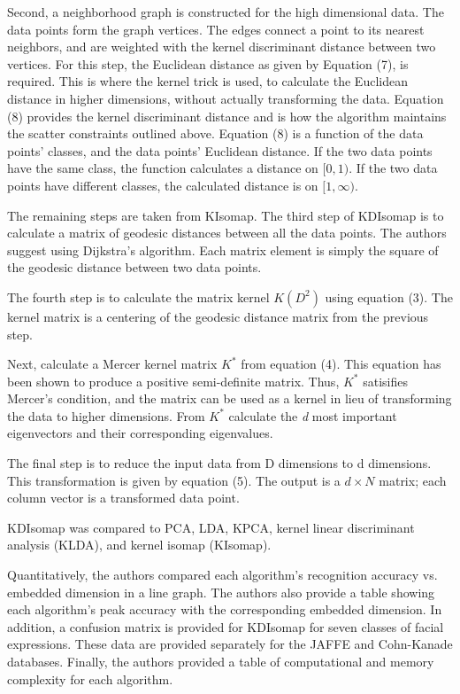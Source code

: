 \documentclass[11pt]{article}
\begin{document}
\begin{description}[leftmargin=0in]
        Second, a neighborhood graph is constructed for the high dimensional
        data. The data points form the graph vertices. The edges connect a point
        to its nearest neighbors, and are weighted with the kernel discriminant
        distance between two vertices. For this step, the Euclidean distance as
        given by Equation (7), is required. This is where the kernel trick is
        used, to calculate the Euclidean distance in higher dimensions, without
        actually transforming the data. Equation (8) provides the kernel
        discriminant distance and is how the algorithm maintains the scatter
        constraints outlined above. Equation (8) is a function of the data
        points' classes, and the data points' Euclidean distance. If the two
        data points have the same class, the function calculates a distance on
        \([0, 1)\). If the two data points have different classes, the
        calculated distance is on \([1, \infty)\).

        The remaining steps are taken from KIsomap. The third step of KDIsomap
        is to calculate a matrix of geodesic distances between all the data
        points. The authors suggest using Dijkstra's algorithm. Each matrix
        element is simply the square of the geodesic distance between two data
        points.

        The fourth step is to calculate the matrix kernel \(K(D^2)\) using
        equation (3). The kernel matrix is a centering of the geodesic distance
        matrix from the previous step.

        Next, calculate a Mercer kernel matrix \(K^*\) from equation (4). This
        equation has been shown to produce a positive semi-definite matrix.
        Thus, \(K^*\) satisifies Mercer's condition, and the matrix can be used
        as a kernel in lieu of transforming the data to higher dimensions. From
        \(K^*\) calculate the \emph{d} most important eigenvectors and their
        corresponding eigenvalues.

        The final step is to reduce the input data from D dimensions to d
        dimensions. This transformation is given by equation (5). The output is
        a \(d \times N\) matrix; each column vector is a transformed data point.

    \item [Experiments] KDIsomap was compared to PCA, LDA, KPCA, kernel linear
        discriminant analysis (KLDA), and kernel isomap (KIsomap).

        Quantitatively, the authors compared each algorithm's recognition
        accuracy vs. embedded dimension in a line graph. The authors also
        provide a table showing each algorithm's peak accuracy with the
        corresponding embedded dimension. In addition, a confusion matrix is
        provided for KDIsomap for seven classes of facial expressions. These
        data are provided separately for the JAFFE and Cohn-Kanade databases.
        Finally, the authors provided a table of computational and memory
        complexity for each algorithm.


\end{description}
\end{document}
